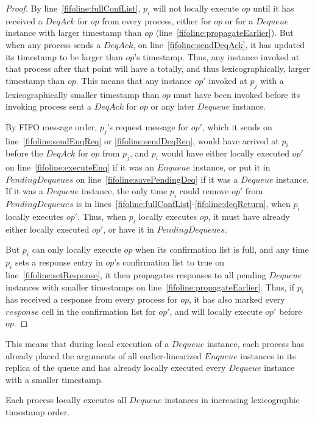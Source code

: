 \documentclass[a4paper,anonymous,USenglish]{lipics-v2021} %
\theoremstyle{definition}
\begin{document}
\begin{proof}
  By line~\ref{fifoline:fullConfList}, $p_i$ will not locally execute $op$ until it has received a $DeqAck$ for $op$ from every process, either for $op$ or for a $Dequeue$ instance with larger timestamp than $op$ (line~\ref{fifoline:propagateEarlier}).  But when any process sends a $DeqAck$, on line~\ref{fifoline:sendDeqAck}, it has updated its timestamp to be larger than $op$'s timestamp.  Thus, any instance invoked at that process after that point will have a totally, and thus lexicographically, larger timestamp than $op$.  This means that any instance $op'$ invoked at $p_j$ with a lexicographically smaller timestamp than $op$ must have been invoked before its invoking process sent a $DeqAck$ for $op$ or any later $Dequeue$ instance.

  By FIFO message order, $p_j$'s request message for $op'$, which it sends on line~\ref{fifoline:sendEnqReq} or \ref{fifoline:sendDeqReq}, would have arrived at $p_i$ before the $DeqAck$ for $op$ from $p_j$, and $p_i$ would have either locally executed $op'$ on line~\ref{fifoline:executeEnq} if it was an $Enqueue$ instance, or put it in $PendingDequeues$ on line~\ref{fifoline:savePendingDeq} if it was a $Dequeue$ instance.  If it was a $Dequeue$ instance, the only time $p_i$ could remove $op'$ from $PendingDequeues$ is in lines~\ref{fifoline:fullConfList}-\ref{fifoline:deqReturn}, when $p_i$ locally executes $op'$.  Thus, when $p_i$ locally executes $op$, it must have already either locally executed $op'$, or have it in $PendingDequeues$.

  But $p_i$ can only locally execute $op$ when its confirmation list is full, and any time $p_i$ sets a response entry in $op$'s confirmation list to true on line~\ref{fifoline:setResponse}, it then propagates responses to all pending $Dequeue$ instances with smaller timestamps on line~\ref{fifoline:propagateEarlier}.  Thus, if $p_i$ has received a response from every process for $op$, it has also marked every $response$ cell in the confirmation list for $op'$, and will locally execute $op'$ before $op$.
\end{proof}

This means that during local execution of a $Dequeue$ instance, each process has already placed the arguments of all earlier-linearized $Enqueue$ instances in its replica of the queue and has already locally executed every $Dequeue$ instance with a smaller timestamp.  

\begin{corollary}\label{fifolem:localExecOrder}
  Each process locally executes all $Dequeue$ instances in increasing lexicographic timestamp order.
\end{corollary}
\end{document}
